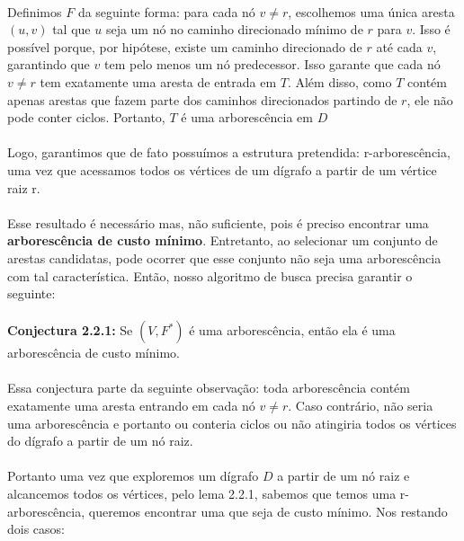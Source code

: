\documentclass[12pt,a4paper]{article}
\begin{document}
\paragraph{}
Definimos \( F \) da seguinte forma: para cada nó \( v \neq r \), escolhemos uma única aresta \( (u, v) \) tal que \( u \) seja um nó no caminho direcionado mínimo de \( r \) para \( v \). Isso é possível porque, por hipótese, existe um caminho direcionado de \( r \) até cada \( v \), garantindo que \( v \) tem pelo menos um nó predecessor. Isso garante que cada nó \( v \neq r \) tem exatamente uma aresta de entrada em \( T \). Além disso, como \( T \) contém apenas arestas que fazem parte dos caminhos direcionados partindo de \( r \), ele não pode conter ciclos. Portanto, \( T \) é uma arborescência em \( D \)

\paragraph{}
Logo, garantimos que de fato possuímos a estrutura pretendida: r-arborescência, uma vez que acessamos todos os vértices de um dígrafo a partir de um vértice raiz r.

\paragraph{}
Esse resultado é necessário mas, não suficiente, pois é preciso encontrar uma \textbf{arborescência de custo mínimo}. Entretanto, ao selecionar um conjunto de arestas candidatas, pode ocorrer que esse conjunto não seja uma arborescência com tal característica. Então, nosso algoritmo de busca precisa garantir o seguinte:

\paragraph{}
\textbf{Conjectura 2.2.1:} Se \((V, F^*)\) é uma arborescência, então ela é uma arborescência de custo mínimo.

\paragraph{}
Essa conjectura parte da seguinte observação: toda arborescência contém exatamente uma aresta entrando em cada nó \( v \neq r \). Caso contrário, não seria uma arborescência e portanto ou conteria ciclos ou não atingiria todos os vértices do dígrafo a partir de um nó raiz.

\paragraph{}
Portanto uma vez que exploremos um dígrafo \(D\) a partir de um nó raiz e alcancemos todos os vértices, pelo lema 2.2.1, sabemos que temos uma r-arborescência, queremos encontrar uma que seja de custo mínimo. Nos restando dois casos:
\end{document}
